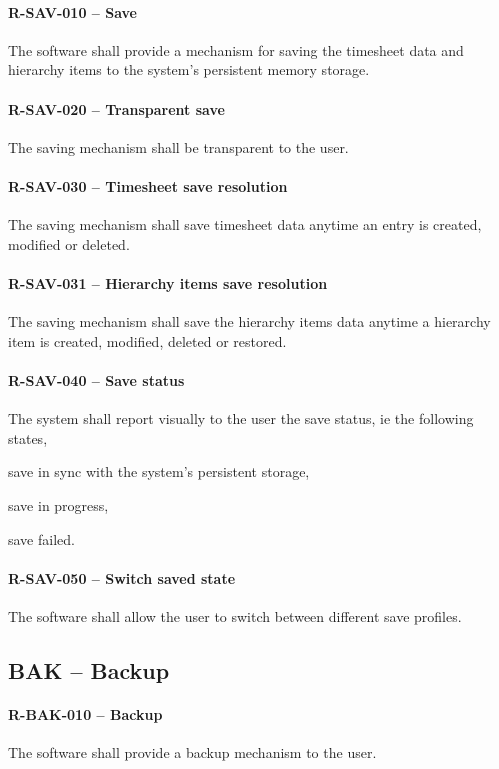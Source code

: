 \paragraph{R-SAV-010 -- Save}
The software shall provide a mechanism for saving the timesheet data
and hierarchy items to the system's persistent memory storage.

\paragraph{R-SAV-020 -- Transparent save}
The saving mechanism shall be transparent to the user.

\paragraph{R-SAV-030 -- Timesheet save resolution}
The saving mechanism shall save timesheet data anytime an entry is
created, modified or deleted.

\paragraph{R-SAV-031 -- Hierarchy items save resolution}
The saving mechanism shall save the hierarchy items data anytime
a hierarchy item is created, modified, deleted or restored.

\paragraph{R-SAV-040 -- Save status}
The system shall report visually to the user the save status, ie
the following states,
\begin{compactitem}
  \item save in sync with the system's persistent storage,
  \item save in progress,
  \item save failed.
\end{compactitem}

\paragraph{R-SAV-050 -- Switch saved state}
The software shall allow the user to switch between different save profiles.

\subsection{BAK -- Backup}
\paragraph{R-BAK-010 -- Backup}
The software shall provide a backup mechanism to the user.


